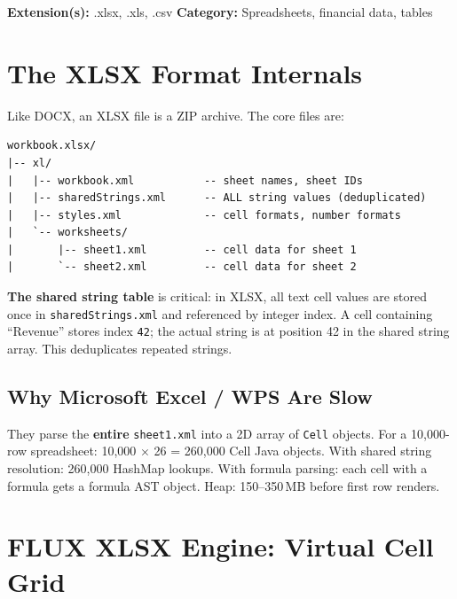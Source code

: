 \documentclass[11pt, a4paper, openright]{report}
\newcommand{\filesection}[3]{%
  \begin{insightbox}[title={File Type Overview: #1}]
  \textbf{Extension(s):} #2 \quad \textbf{Category:} #3
  \end{insightbox}
}
\begin{document}
\filesection{XLSX / XLS / CSV}{.xlsx, .xls, .csv}{Spreadsheets, financial data, tables}

\section{The XLSX Format Internals}

Like DOCX, an XLSX file is a ZIP archive. The core files are:

\begin{lstlisting}[caption=XLSX Internal Structure]
workbook.xlsx/
|-- xl/
|   |-- workbook.xml           -- sheet names, sheet IDs
|   |-- sharedStrings.xml      -- ALL string values (deduplicated)
|   |-- styles.xml             -- cell formats, number formats
|   `-- worksheets/
|       |-- sheet1.xml         -- cell data for sheet 1
|       `-- sheet2.xml         -- cell data for sheet 2
\end{lstlisting}

\textbf{The shared string table} is critical: in XLSX, all text cell values are stored once in \texttt{sharedStrings.xml} and referenced by integer index. A cell containing ``Revenue'' stores index \texttt{42}; the actual string is at position 42 in the shared string array. This deduplicates repeated strings.

\subsection{Why Microsoft Excel / WPS Are Slow}

They parse the \textbf{entire} \texttt{sheet1.xml} into a 2D array of \texttt{Cell} objects. For a 10,000-row spreadsheet: 10,000 $\times$ 26 = 260,000 Cell Java objects. With shared string resolution: 260,000 HashMap lookups. With formula parsing: each cell with a formula gets a formula AST object. Heap: 150--350\,MB before first row renders.

\section{FLUX XLSX Engine: Virtual Cell Grid}
\end{document}

